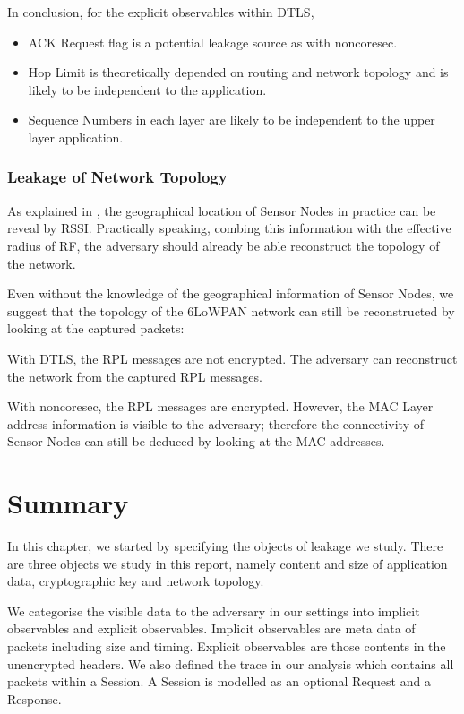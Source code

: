 In conclusion, for the explicit observables within DTLS,

\begin{itemize}
	\item ACK Request flag is a potential leakage source as with noncoresec.
	\item Hop Limit is theoretically depended on routing and network topology and is likely to be independent to the application.
	\item Sequence Numbers in each layer are likely to be independent to the upper layer application.
\end{itemize}

\subsubsection{Leakage of Network Topology}

As explained in , the geographical location of Sensor Nodes in practice can be reveal by RSSI. Practically speaking, combing this information with the effective radius of RF, the adversary should already be able reconstruct the topology of the network.

Even without the knowledge of the geographical information of Sensor Nodes, we suggest that the topology of the 6LoWPAN network can still be reconstructed by looking at the captured packets:

\begin{description}[style=nextline]
	\item With DTLS, the RPL messages are not encrypted. The adversary can reconstruct the network from the captured RPL messages.
	\item With noncoresec, the RPL messages are encrypted. However, the MAC Layer address information is visible to the adversary; therefore the connectivity of Sensor Nodes can still be deduced by looking at the MAC addresses.
\end{description}

\section{Summary}

In this chapter, we started by specifying the objects of leakage we study. There are three objects we study in this report, namely content and size of application data, cryptographic key and network topology.

We categorise the visible data to the adversary in our settings into implicit observables and explicit observables. Implicit observables are meta data of packets including size and timing. Explicit observables are those contents in the unencrypted headers. We also defined the trace in our analysis which contains all packets within a Session. A Session is modelled as an optional Request and a Response.

